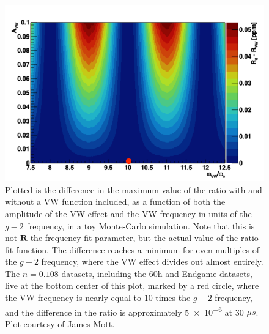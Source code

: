 \documentclass[12pt,letterpaper]{report}
\def\gmtwo{$g-2$\xspace}
\begin{document}
\begin{figure}[]
    \centering
    \includegraphics[width=\textwidth]{VWRatioDiff}
    \caption[]{Plotted is the difference in the maximum value of the ratio with and without a VW function included, as a function of both the amplitude of the VW effect and the VW frequency in units of the \gmtwo frequency, in a toy Monte-Carlo simulation. Note that this is not $\boldsymbol{R}$ the frequency fit parameter, but the actual value of the ratio fit function. The difference reaches a minimum for even multiples of the \gmtwo frequency, where the VW effect divides out almost entirely. The $n = 0.108$ datasets, including the 60h and Endgame datasets, live at the bottom center of this plot, marked by a red circle, where the VW frequency is nearly equal to 10 times the \gmtwo frequency, and the difference in the ratio is approximately \SI{5e-6}{} at 30 $\mu s$. Plot courtesy of James Mott.}
    \label{fig:VWRatioDiff}
\end{figure}
\end{document}
